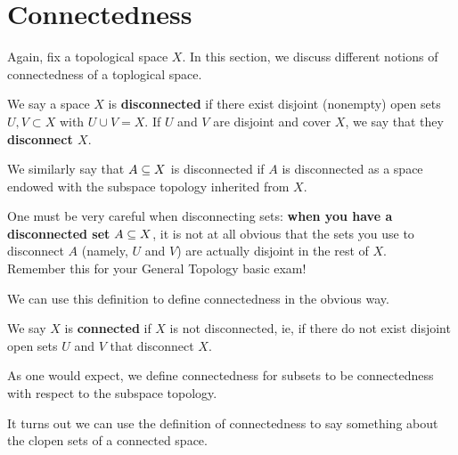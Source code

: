 \section{Connectedness}

Again, fix a topological space $X$. In this section, we discuss different notions of connectedness of a toplogical space.

\begin{boxdefinition}[Disconnectedness]
    We say a space $X$ is \textbf{disconnected} if there exist disjoint (nonempty) open sets $U, V \subset X$ with $U \cup V = X$. If $U$ and $V$ are disjoint and cover $X$, we say that they \textbf{disconnect $X$}.
\end{boxdefinition}

We similarly say that $A\subseteq X$ is disconnected if $A$ is disconnected as a space endowed with the subspace topology inherited from $X$.

\begin{boxwarning}
     One must be very careful when disconnecting sets: \textbf{when you have a disconnected set} $A\subseteq X$, it is not at all obvious that the sets you use to disconnect $A$ (namely, $U$ and $V$) are actually disjoint in the rest of $X$.\\
     
     Remember this for your General Topology basic exam!
\end{boxwarning}

We can use this definition to define connectedness in the obvious way.

\begin{boxdefinition}[Connectedness]
    We say $X$ is \textbf{connected} if $X$ is not disconnected, ie, if there do not exist disjoint open sets $U$ and $V$ that disconnect $X$.
\end{boxdefinition}

As one would expect, we define connectedness for subsets to be connectedness with respect to the subspace topology.

It turns out we can use the definition of connectedness to say something about the clopen sets of a connected space.

